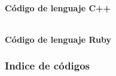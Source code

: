 \documentclass{article}
\begin{document}
~\\

\textbf{Código de lenguaje C++}



~\\

\textbf{Código de lenguaje Ruby}



\subsubsection{Indice de códigos}
\lstlistoflistings
\end{document}
